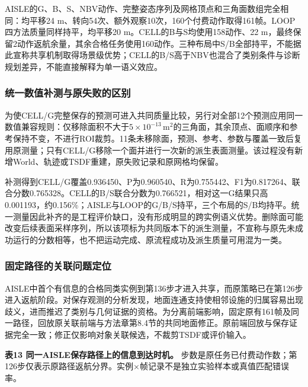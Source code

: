 \documentclass[11pt,a4paper]{article}
\numberwithin{equation}{section}
\begin{document}
AISLE的G、B、S、NBV动作、完整姿态序列及网格顶点和三角面数组完全相同：均平移24 m、转向54次、额外观察10次，160个付费动作取得161帧。LOOP四方法质量同样持平，均平移20 m。CELL的B与S均使用158动作、22 m，最终保留2动作返航余量，其余合格任务使用160动作。三种布局中S/B全部持平，不能据此宣称共享机制取得场景级优势；CELL的B/S高于NBV也混合了类别条件与诊断规划差异，不能直接解释为单一语义效应。

\hypertarget{ux7edfux4e00ux6570ux503cux8865ux6d4bux4e0eux539fux5931ux8d25ux7684ux533aux522b}{%
\subsubsection{统一数值补测与原失败的区别}\label{ux7edfux4e00ux6570ux503cux8865ux6d4bux4e0eux539fux5931ux8d25ux7684ux533aux522b}}

为使CELL/G完整保存的预测可进入共同质量比较，另行对全部12个预测应用同一数值兼容规则：仅移除面积不大于\(5\times10^{-13}\,\mathrm{m}^2\)的三角面，其余顶点、面顺序和参考保持不变，不进行ROI裁剪。11条未移除面，预测、参考、参数与覆盖一致后复用原测量；只有CELL/G移除一个面并进行一次新的派生表面测量。该过程没有新增World、轨迹或TSDF重建，原失败记录和原网格均保留。

补测得到CELL/G覆盖0.936450、P为0.960540、R为0.755442、F1为0.817264、联合分数0.765328。CELL的B/S联合分数为0.766521，相对这一G结果只高0.001193，约0.156\%；AISLE与LOOP的G/B/S持平，三个布局的S/B均持平。统一测量因此补齐的是工程评价缺口，没有形成明显的跨实例语义优势。删除面可能改变后续表面采样序列，所以该项标为共同版本下的派生测量，不宣称与原先未成功运行的分数相等，也不把运动完成、原流程成功及派生质量可用混为一类。

\hypertarget{ux56faux5b9aux8defux5f84ux7684ux5173ux8054ux95eeux9898ux5b9aux4f4d}{%
\subsubsection{固定路径的关联问题定位}\label{ux56faux5b9aux8defux5f84ux7684ux5173ux8054ux95eeux9898ux5b9aux4f4d}}

AISLE中首个有信息的合格同类实例到第136步才进入共享，而原策略已在第126步进入返航阶段。对保存观测的分析发现，地面连通支持使相邻设施的归属容易出现歧义，进而推迟了类别与几何证据的资格。为分离前端影响，固定原有161帧及同一路径，回放原关联前端与方法章第8.4节的共同地面修正。原前端回放与保存证据完全一致；修正仅影响对象关联候选，不裁剪TSDF或评价输入。

\textbf{表13 同一AISLE保存路径上的信息到达时机。} 步数是原任务已付费动作数；第126步仅表示原路径返航分界。实例×帧记录不是独立实验样本或真值匹配错误率。
\end{document}
